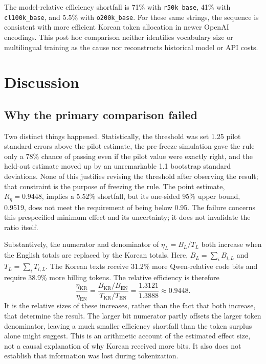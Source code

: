\documentclass[11pt,a4paper]{article}
\newcommand{\Reta}{R_{\eta}}
\newcommand{\ko}{\mathrm{KR}}
\newcommand{\en}{\mathrm{EN}}
\begin{document}
The model-relative efficiency shortfall is 71\% with
\texttt{r50k\_base}, 41\% with \texttt{cl100k\_base}, and 5.5\% with
\texttt{o200k\_base}. For these same strings, the sequence is consistent
with more efficient Korean token allocation in newer OpenAI encodings. This
post hoc comparison neither identifies vocabulary size or multilingual
training as the cause nor reconstructs historical model or API costs.

\section{Discussion}
\label{sec:discussion}

\subsection{Why the primary comparison failed}

Two distinct things happened. Statistically, the threshold was set 1.25
pilot standard errors above the pilot estimate, the
pre-freeze simulation gave the rule only a 78\% chance of passing even if
the pilot value were exactly right, and the held-out estimate moved up by an
unremarkable 1.1 bootstrap standard deviations. None of this justifies
revising the threshold after observing the result; that constraint is the
purpose of freezing the rule. The point estimate, $\Reta=0.9448$, implies a
5.52\% shortfall, but its one-sided 95\% upper bound, 0.9519, does not meet
the requirement of being below 0.95. The failure concerns this prespecified
minimum effect and its uncertainty; it does not invalidate the ratio itself.

Substantively, the numerator and denominator of $\eta_L=B_L/T_L$ both
increase when the English totals are replaced by the Korean totals. Here,
$B_L=\sum_i B_{i,L}$ and $T_L=\sum_i T_{i,L}$. The Korean texts receive
31.2\% more Qwen-relative code bits and require 38.9\% more billing tokens.
The relative efficiency is therefore
\begin{equation}
  \frac{\eta_\ko}{\eta_\en}
  =\frac{B_\ko/B_\en}{T_\ko/T_\en}
  =\frac{1.3121}{1.3888}\approx0.9448.
  \label{eq:joint-increase}
\end{equation}
It is the relative sizes of these increases, rather than the fact that both
increase, that determine the result. The larger bit numerator partly offsets
the larger token denominator, leaving a much smaller efficiency shortfall
than the token surplus alone might suggest. This is an arithmetic account of
the estimated effect size, not a causal explanation of why Korean received
more bits. It also does not establish that information was lost during
tokenization.
\end{document}
